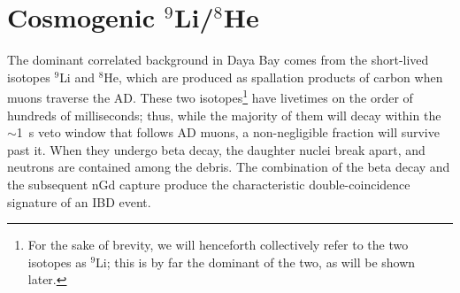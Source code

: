 \documentclass[../thesis.tex]{subfiles}
\begin{document}
\begin{comment}
  As previously stated, the accidental background can be straightforwardly
  measured based on the characteristics of singles events. The singles spectrum
  is first measured by searching for prompt-like events that satisfy the usual
  muon vetos but are separated from other prompt-like events by at least
  400~$\mu$s. The total integral of this spectrum gives the prompt-like rate
  $R_p$, while the integral above 6~MeV gives the delayed-like rate $R_d$. The
  accidental background rate is then simply
  \[ R_\mathrm{acc} = R_d(1 - e^{-R_p\Delta t})e^{-2R_p\Delta t}, \] where the
  factor in parentheses is the probability for a prompt-like single to fall
  within the $\Delta t$~=~200~$\mu$s preceding a delayed-like single, and the
  final factor is the probability that the event is \emph{not} rejected by the
  decoupled multiplicity cut, which disallows any additional prompt-like single
  in the 400~$\mu$s preceding the delayed event. Once the rate has been
  determined this way, the spectrum is trivial: It is simply the singles
  spectrum itself.
\end{comment}

\begin{comment}
  Mention IHEP's cross-check, and the additional uncertainty stemming from the
  difference between it and the nominal result?
\end{comment}

\section{Cosmogenic $^9$Li/$^8$He}
\label{sec:bkgCosmo}

\newcommand\linine{$^9$Li}

The dominant correlated background in Daya Bay comes from the short-lived
isotopes $^9$Li and $^8$He, which are produced as spallation products of carbon
when muons traverse the AD. These two isotopes\footnote{For the sake of brevity,
  we will henceforth collectively refer to the two isotopes as \linine; this is
  by far the dominant of the two, as will be shown later.} have livetimes on the
order of hundreds of milliseconds; thus, while the majority of them will decay
within the $\sim$1~s veto window that follows AD muons, a non-negligible
fraction will survive past it. When they undergo beta decay, the daughter nuclei
break apart, and neutrons are contained among the debris. The combination of the
beta decay and the subsequent nGd capture produce the characteristic
double-coincidence signature of an IBD event.
\end{document}

